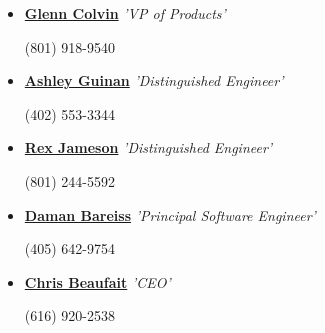 \documentclass[11pt,a4paper,sans]{moderncv}        %
\begin{document}
\begin{itemize}

\item{\textbf{\href{https://www.linkedin.com/in/gecolvin/}{Glenn Colvin}}  \textit{'VP of Products'} \begin{flushright}\small{{(801) 918-9540}}\end{flushright}}

\item{\textbf{\href{https://www.linkedin.com/in/aguinan/}{Ashley Guinan}}  \textit{'Distinguished Engineer'} \begin{flushright}\small{{(402) 553-3344}}\end{flushright}}

\item{\textbf{\href{https://www.linkedin.com/in/rexmjameson/}{Rex Jameson}} \textit{'Distinguished Engineer'}\begin{flushright}\small{{(801) 244-5592}}\end{flushright}}

\item{\textbf{\href{https://www.linkedin.com/in/daman-bareiss/}{Daman Bareiss}} \textit{'Principal Software Engineer'}\begin{flushright}\small{{(405) 642-9754}}\end{flushright}}

\item{\textbf{\href{https://www.linkedin.com/in/chrisbeaufait/}{Chris Beaufait}}  \textit{'CEO'} \begin{flushright}\small{{(616) 920-2538}}\end{flushright}}
\end{itemize}

\nocite{*}



\end{document}
